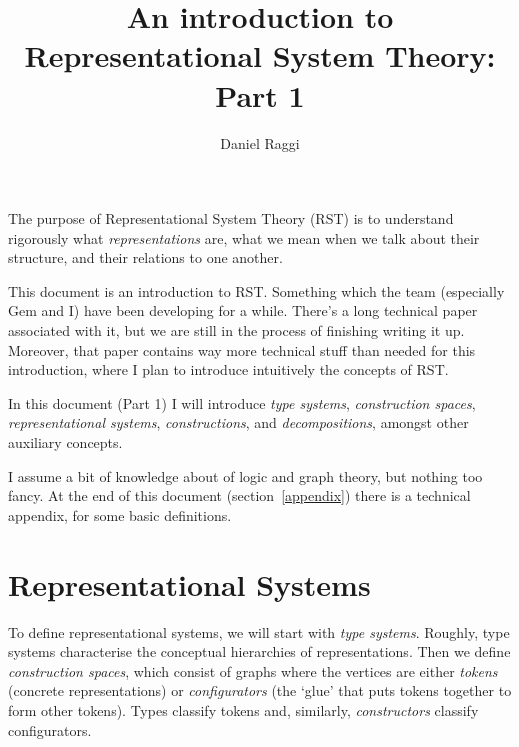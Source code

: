 \documentclass[a4paper]{article}
\title{An introduction to Representational System Theory: Part 1}
\author{Daniel Raggi}
\theoremstyle{definition}
\begin{document}
	\maketitle
	
	The purpose of Representational System Theory (RST) is to understand rigorously what \textit{representations} are, what we mean when we talk about their structure, and their relations to one another.
	
	This document is an introduction to RST. Something which the team (especially Gem and I) have been developing for a while. There's a long technical paper associated with it, but we are still in the process of finishing writing it up. Moreover, that paper contains way more technical stuff than needed for this introduction, where I plan to introduce intuitively the concepts of RST.
	
	In this document (Part 1) I will introduce \textit{type systems}, \textit{construction spaces}, \textit{representational systems}, \textit{constructions}, and \textit{decompositions}, amongst other auxiliary concepts.
	
	I assume a bit of knowledge about of logic and graph theory, but nothing too fancy. At the end of this document (section~\ref{appendix}) there is a technical appendix, for some basic definitions.
	
	
	\section{Representational Systems}
	To define representational systems, we will start with \textit{type systems}. Roughly, type systems characterise the conceptual hierarchies of representations. Then we define \textit{construction spaces}, which consist of graphs where the vertices are either \textit{tokens} (concrete representations) or \textit{configurators} (the `glue' that puts tokens together to form other tokens). Types classify tokens and, similarly, \textit{constructors} classify configurators.
\end{document}
